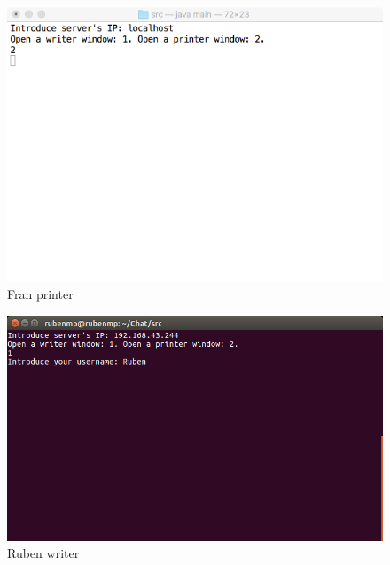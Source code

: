 \vspace{0.1cm}

\begin{figure}[H]
	\includegraphics[scale=0.65]{./Imagenes/franprinter1.png}
	\caption{Fran printer}
\end{figure}

\vspace{0.1cm}

\begin{figure}[H]
	\includegraphics[scale=0.65]{./Imagenes/rubenwriter1.png}
	\caption{Ruben writer}
\end{figure}

\vspace{0.1cm}

